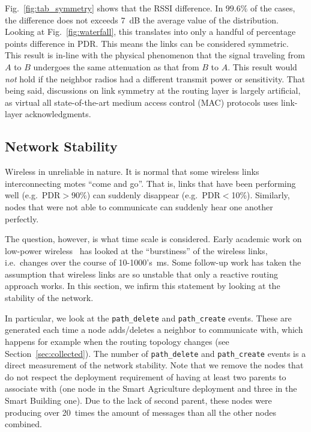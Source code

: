 \documentclass{elsarticle}
\newcommand{\building}            {Smart Building\xspace}
\newcommand{\agri}                {Smart Agriculture\xspace}
\newcommand{\pathcreate}          {{\tt path\_create}\xspace}
\newcommand{\pathdelete}          {{\tt path\_delete}\xspace}
\begin{document}
Fig.~\ref{fig:tab_symmetry} shows that the RSSI difference. In $99.6\%$ of the cases, the difference does not exceeds 7~dB the average value of the distribution.
Looking at Fig.~\ref{fig:waterfall}, this translates into only a handful of percentage points difference in PDR.
This means the links can be considered symmetric.
This result is in-line with the physical phenomenon that the signal traveling from $A$ to $B$ undergoes the same attenuation as that from $B$ to $A$.
This result would \textit{not} hold if the neighbor radios had a different transmit power or sensitivity.
That being said, discussions on link symmetry at the routing layer is largely artificial, as virtual all state-of-the-art medium access control (MAC) protocols uses link-layer acknowledgments.

\subsection{Network Stability}
\label{sec:net_stability}


Wireless in unreliable in nature.
It is normal that some wireless links interconnecting motes ``come and go''.
That is, links that have been performing well (e.g.~PDR$>$90\%) can suddenly disappear (e.g.~PDR$<$10\%).
Similarly, nodes that were not able to communicate can suddenly hear one another perfectly.


The question, however, is what time scale is considered.
Early academic work on low-power wireless~\cite{srinivasan08beta} has looked at the ``burstiness'' of the wireless links, i.e.~changes over the course of 10-1000's~ms.
Some follow-up work has taken the assumption that wireless links are so unstable that only a reactive routing approach works.
In this section, we infirm this statement by looking at the stability of the network.


In particular, we look at the \pathdelete and \pathcreate events.
These are generated each time a node adds/deletes a neighbor to communicate with, which happens for example when the routing topology changes (see Section~\ref{sec:collected}).
The number of \pathdelete and \pathcreate events is a direct measurement of the network stability.
Note that we remove the nodes that do not respect the deployment requirement of having at least two parents to associate with (one node in the \agri deployment and three in the \building one).
Due to the lack of second parent, these nodes were producing over 20~times the amount of messages than all the other nodes combined.
\end{document}
